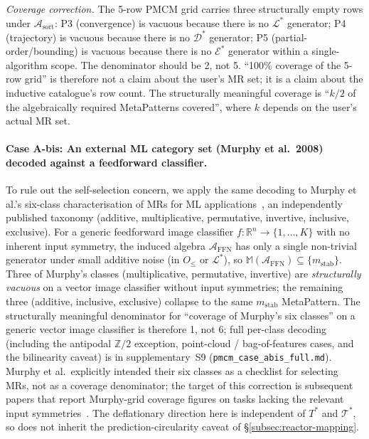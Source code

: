 \documentclass[acmsmall, screen]{acmart}
\begin{document}
\noindent \emph{Coverage correction.} The 5-row PMCM grid carries three structurally empty rows under $\mathcal{A}_{\mathrm{sort}}$: P3 (convergence) is vacuous because there is no $\mathcal{L}^{*}$ generator; P4 (trajectory) is vacuous because there is no $\mathcal{D}^{*}$ generator; P5 (partial-order/bounding) is vacuous because there is no $\mathcal{E}^{*}$ generator within a single-algorithm scope. The denominator should be 2, not 5. ``100\% coverage of the 5-row grid'' is therefore not a claim about the user's MR set; it is a claim about the inductive catalogue's row count. The structurally meaningful coverage is ``$k/2$ of the algebraically required MetaPatterns covered'', where $k$ depends on the user's actual MR set.

\paragraph{Case A-bis: An external ML category set (Murphy et al.\ 2008) decoded against a feedforward classifier.}
\label{para:case-a-bis}
To rule out the self-selection concern, we apply the same decoding to Murphy et al.'s six-class characterisation of MRs for ML applications~\cite{Murphy2008, Xie2011, Saha2019SupervisedMR}, an independently published taxonomy (additive, multiplicative, permutative, invertive, inclusive, exclusive). For a generic feedforward image classifier $f: \mathbb{R}^{n} \to \{1, \dots, K\}$ with no inherent input symmetry, the induced algebra $\mathcal{A}_{\mathrm{FFN}}$ has only a single non-trivial generator under small additive noise (in $O_{\le}$ or $\mathcal{L}^{*}$), so $\mathbb{M}(\mathcal{A}_{\mathrm{FFN}}) \subseteq \{m_{\mathrm{stab}}\}$. Three of Murphy's classes (multiplicative, permutative, invertive) are \emph{structurally vacuous} on a vector image classifier without input symmetries; the remaining three (additive, inclusive, exclusive) collapse to the same $m_{\mathrm{stab}}$ MetaPattern. The structurally meaningful denominator for ``coverage of Murphy's six classes'' on a generic vector image classifier is therefore 1, not 6; full per-class decoding (including the antipodal $\mathbb{Z}/2$ exception, point-cloud / bag-of-features cases, and the bilinearity caveat) is in supplementary~S9 (\texttt{pmcm\_case\_abis\_full.md}). Murphy et al.\ explicitly intended their six classes as a checklist for selecting MRs, not as a coverage denominator; the target of this correction is subsequent papers that report Murphy-grid coverage figures on tasks lacking the relevant input symmetries~\cite{Saha2019SupervisedMR}. The deflationary direction here is independent of $T^{*}$ and $\mathcal{T}^{*}$, so does not inherit the prediction-circularity caveat of \S\ref{subsec:reactor-mapping}.
\end{document}
